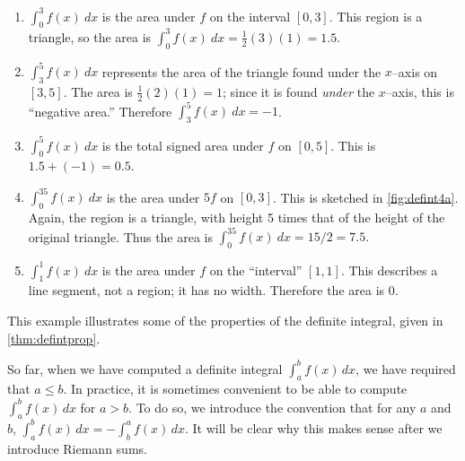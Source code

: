 {\begin{enumerate}
	\item	$ \int_0^3 f(x)\ dx$ is the area under $f$ on the interval $[0,3]$. This region is a triangle, so the area is $\int_0^3 f(x)\ dx=\frac12(3)(1) = 1.5$. 
	\item	$\int_3^5 f(x)\ dx$ represents the area of the triangle found under the $x$--axis on $[3,5]$. The area is $\frac12(2)(1) = 1$; since it is found \textit{under} the $x$--axis, this is ``negative area.'' Therefore $ \int_3^5 f(x)\ dx = -1$.
	\item	$ \int_0^5f(x)\ dx$ is the total signed area under $f$ on $[0,5]$. This is $1.5 + (-1) = 0.5$.
	\item	$ \int_0^35f(x)\ dx$ is the area under $5f$ on $[0,3]$. This is sketched in \autoref{fig:defint4a}. Again, the region is a triangle, with height 5 times that of the height of the original triangle. Thus the area is $ \int_0^35f(x)\ dx = 15/2 = 7.5.$
		
		
	\item	$\int_1^1f(x)\ dx$ is the area under $f$ on the ``interval'' $[1,1]$. This describes a line segment, not a region; it has no width. Therefore the area is 0.\eoehere
\end{enumerate}}

This example illustrates some of the properties of the definite integral, given in \autoref{thm:defintprop}.

So far, when we have computed a definite integral $\int_a^b f(x)\,dx$, we have required that $a\leq b$. In practice, it is sometimes convenient to be able to compute $\int_a^b f(x)\,dx$ for $a>b$. To do so, we introduce the convention that for any $a$ and $b$, $\int_a^b f(x)\,dx=-\int_b^a f(x)\,dx$. It will be clear why this makes sense after we introduce Riemann sums.

